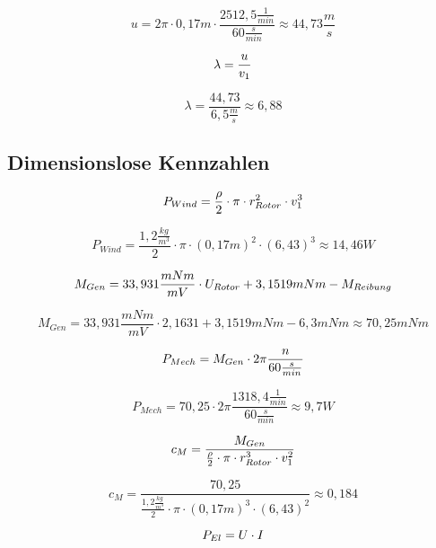 $$    u = 2 \pi \cdot 0,17m \cdot \frac{2512,5 \frac{1}{min}}{60 \frac{s}{min}}\approx 44,73\frac{m}{s} $$

\begin{equation}
    \centering
    \lambda = \frac{u}{v_1}
    \label{eq:230615_Schnelllaufzahl}
\end{equation}

$$\lambda = \frac{44,73}{6,5 \frac{m}{s}}\approx 6,88$$


\subsection{Dimensionslose Kennzahlen}

\begin{equation}
    \centering
    P_{Wind} = \frac{\rho}{2} \cdot \pi \cdot r_{Rotor}^2 \cdot v_1^3
    \label{eq:230615_Leistung_Wind}
\end{equation}

$$P_{Wind} = \frac{1,2 \frac{kg}{m^3}}{2} \cdot \pi \cdot (0,17 m)^2 \cdot (6,43)^3 \approx 14,46 W$$

\begin{equation}
    \centering
    M_{Gen} = 33,931\frac{mNm}{mV} \cdot U_{Rotor} + 3,1519 mNm - M_{Reibung}
    \label{eq:230615_Genratormoment}
\end{equation}

$$M_{Gen} = 33,931\frac{mNm}{mV} \cdot 2,1631 + 3,1519 mNm - 6,3mNm \approx 70,25 mNm$$

\begin{equation}
    \centering
    P_{Mech} = M_{Gen} \cdot 2 \pi \frac{n}{60\frac{s}{min}}
    \label{eq:230615_Mechanischeleistung}
\end{equation}

$$P_{Mech} = 70,25 \cdot 2 \pi \frac{1318,4 \frac{1}{min}}{60\frac{s}{min}} \approx 9,7W$$

\begin{equation}
    \centering
    c_M = \frac{M_{Gen}}{ \frac{\rho}{2} \cdot \pi \cdot r_{Rotor}^3 \cdot v_1^2}
    \label{eq:230615_Momentenbeiwert}
\end{equation}

$$c_M = \frac{70,25}{ \frac{1,2 \frac{kg}{m^3}}{2} \cdot \pi \cdot (0,17 m)^3 \cdot (6,43)^2}\approx 0,184$$

\begin{equation}
    \centering
    P_{El} = U \cdot I
    \label{eq:230615_Elektrische_Leistung}
\end{equation}

